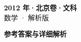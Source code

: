 \documentclass[zihao=-4, a4paper]{ctexart}
\begin{document}
\begin{center}
  {\Large\bfseries 2012 年·北京卷·文科}\\[4pt]
  {\large 数学 · 解析版}
\end{center}
\medskip
{}

\clearpage
{}
\begin{center}{\Large\bfseries 参考答案与详细解析}\end{center}
\medskip

\end{document}
